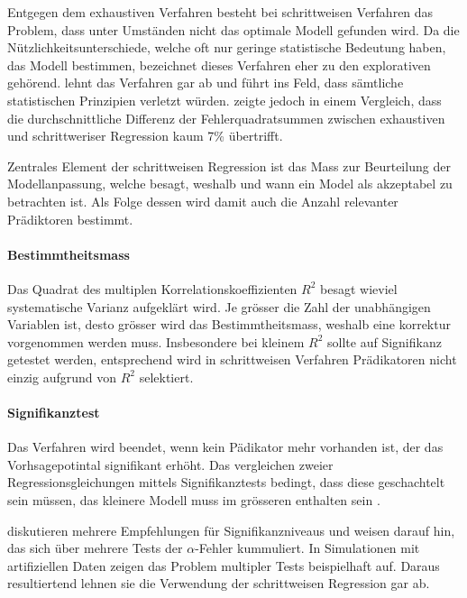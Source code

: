 \documentclass[english,12pt,doc]{apa}
\begin{document}
Entgegen dem exhaustiven Verfahren besteht bei schrittweisen Verfahren das Problem, dass unter Umständen nicht das optimale Modell gefunden wird. Da die Nützlichkeitsunterschiede, welche oft nur geringe statistische Bedeutung haben, das Modell bestimmen, bezeichnet  dieses Verfahren eher zu den explorativen gehörend.  lehnt das Verfahren gar ab und führt ins Feld, dass sämtliche statistischen Prinzipien verletzt würden.  zeigte jedoch in einem Vergleich, dass die durchschnittliche Differenz der Fehlerquadratsummen zwischen exhaustiven und schrittweriser Regression kaum 7\% übertrifft. 

Zentrales Element der schrittweisen Regression ist das Mass zur Beurteilung der  Modellanpassung, welche besagt, weshalb und wann ein Model als akzeptabel zu betrachten ist. Als Folge dessen wird damit auch die Anzahl relevanter Prädiktoren bestimmt.

\paragraph{Bestimmtheitsmass}  Das Quadrat des multiplen Korrelationskoeffizienten $R^2$ besagt wieviel systematische Varianz aufgeklärt wird. Je grösser die Zahl der unabhängigen Variablen ist, desto grösser wird das Bestimmtheitsmass, weshalb eine korrektur vorgenommen werden muss. Insbesondere bei kleinem $R^2$ sollte auf Signifikanz getestet werden, entsprechend wird in schrittweisen Verfahren Prädikatoren nicht einzig aufgrund von $R^2$ selektiert. 

\paragraph{Signifikanztest} Das Verfahren wird beendet, wenn kein Pädikator mehr vorhanden ist, der das Vorhsagepotintal signifikant erhöht. Das vergleichen zweier Regressionsgleichungen mittels Signifikanztests bedingt, dass diese geschachtelt sein müssen, das kleinere Modell muss im grösseren enthalten sein \cite[p. 508]{jacob2003applied}.

 diskutieren mehrere Empfehlungen für Signifikanzniveaus und weisen darauf hin, das sich über mehrere Tests der $\alpha$-Fehler kummuliert. In  Simulationen mit artifiziellen Daten zeigen  das  Problem multipler Tests beispielhaft auf. Daraus resultiertend lehnen sie die Verwendung der schrittweisen Regression gar ab.
 
\end{document}
